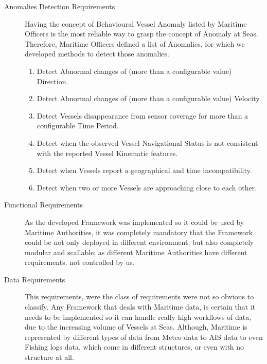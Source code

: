 \begin{description}
\item[Anomalies Detection Requirements] Having the concept of Behavioural Vessel Anomaly listed by Maritime Officers is the most reliable way to grasp the concept of Anomaly at Seas. Therefore, Maritime Officers defined a list of Anomalies, for which we developed methods to detect those anomalies. 
\begin{enumerate}[label=(\subscript{AR}{{\arabic*}})]
    \item
    Detect Abnormal changes of (more than a configurable value) Direction.
     \item
    Detect Abnormal changes of (more than a configurable value) Velocity.
    \item
    Detect Vessels disappearance from sensor coverage for more than a configurable Time Period.
    \item
    Detect when the observed Vessel Navigational Status is not consistent with the reported Vessel Kinematic features.
    \item
    Detect when Vessels report a geographical and time incompatibility.
    \item
    Detect when two or more Vessels are approaching close to each other.
\end{enumerate}






\item [Functional Requirements] As the developed Framework was implemented so it could be used by Maritime Authorities, it was completely mandatory that the Framework could be not only deployed in different environment, but also completely modular and scallable; as different Maritime Authorities have different requirements. 
not controlled by us.

\item [Data Requirements] This requirements, were the class of requirements were not so obvious to classify. Any Framework that deals with Maritime data, is certain that it needs to be implemented so it can handle really high workflows of data, due to the increasing volume of Vessels at Seas. Although, Maritime is represented by different types of data from Meteo data to AIS data to even Fishing logs data, which come in different structures, or even with no structure at all.
\end{description}

